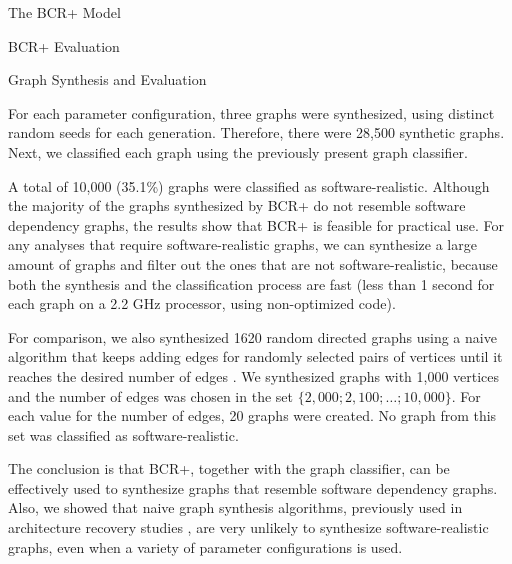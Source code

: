 \documentclass[11pt,twocolumn,a4paper,english]{article}
\newcommand{\TODO}{\textbf{TODO:} }
\begin{document}
\begin{section}{The BCR+ Model}
\begin{subsection}{BCR+ Evaluation}
\begin{subsubsection}{Graph Synthesis and Evaluation}
	
	For each parameter configuration, three graphs were synthesized, using distinct random seeds for each generation. Therefore, there were 28,500 synthetic graphs. Next, we classified each graph using the previously present graph classifier.

	
	A total of 10,000 (35.1\%) graphs were classified as software-realistic. Although the majority of the graphs synthesized by BCR+ do not resemble software dependency graphs, the results show that BCR+ is feasible for practical use. For any analyses that require software-realistic graphs, we can synthesize a large amount of graphs and filter out the ones that are not software-realistic, because both the synthesis and the classification process are fast (less than 1 second for each graph on a 2.2 GHz processor, using non-optimized code).

	For comparison, we also synthesized 1620 random directed graphs using a naive algorithm that keeps adding edges for randomly selected pairs of vertices until it reaches the desired number of edges \cite{Erdos1959}. We synthesized graphs with 1,000 vertices and the number of edges was chosen in the set $\{2,000; 2,100; \ldots ; 10,000\}$. For each value for the number of edges, 20 graphs were created. No graph from this set was classified as software-realistic. 
	
	The conclusion is that BCR+, together with the graph classifier, can be effectively used to synthesize graphs that resemble software dependency graphs. Also, we showed that naive graph synthesis algorithms, previously used in architecture recovery studies \cite{Mitchell2007}, are very unlikely to synthesize software-realistic graphs, even when a variety of parameter configurations is used.
	
	
	
\end{subsubsection}

\end{subsection}	
\end{section}
\end{document}
